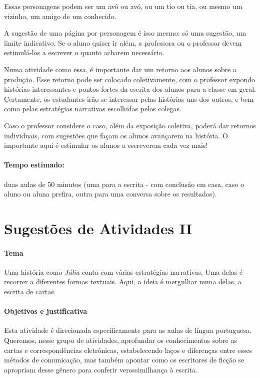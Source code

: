 \documentclass[12pt]{extarticle}
\begin{document}
Essas personagens podem ser um avô ou avó, ou um tio ou tia, ou mesmo um
vizinho, um amigo de um conhecido.

A sugestão de uma página por personagem é isso mesmo: só uma sugestão,
um limite indicativo. Se o aluno quiser ir além, a professora ou o
professor devem estimulá-los a escrever o quanto acharem necessário.

Numa atividade como essa, é importante dar um retorno aos alunos sobre a
produção. Esse retorno pode ser colocado coletivamente, com o professor
expondo histórias interessantes e pontos fortes da escrita dos alunos
para a classe em geral. Certamente, os estudantes irão se interessar
pelas histórias uns dos outros, e bem como pelas estratégias narrativas
escolhidas pelos colegas.

Caso o professor considere o caso, além da exposição coletiva, poderá
dar retornos individuais, com sugestões que façam os alunos avançarem na
história. O importante aqui é estimular os alunos a escreverem cada vez
mais!

\paragraph{Tempo estimado:} duas aulas de 50 minutos (uma para a escrita -
com conclusão em casa, caso o aluno ou aluna prefira, outra para uma
conversa sobre os resultados).

\section{Sugestões de Atividades II}

\paragraph{Tema}

Uma história como \emph{Júlia} conta com várias estratégias narrativas.
Uma delas é recorrer a diferentes formas textuais. Aqui, a ideia é
mergulhar numa delas, a escrita de cartas.



\paragraph{Objetivos e justificativa}

Esta atividade é direcionada especificamente para as aulas de língua
portuguesa. Queremos, nesse grupo de atividades, aprofundar os
conhecimentos sobre as cartas e correspondências eletrônicas,
estabelecendo laços e diferenças entre esses métodos de comunicação, mas
também apontar como os escritores de ficção se apropriam desse gênero
para conferir verossimilhança à escrita.
\end{document}

